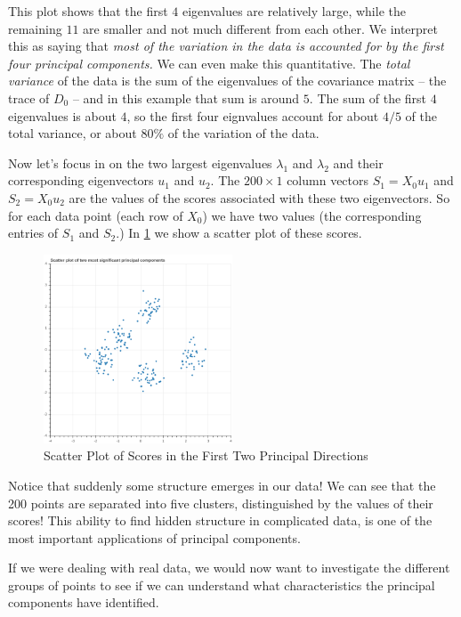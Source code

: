 \documentclass[
]{article}
\begin{document}
This plot shows that the first \(4\) eigenvalues are relatively large,
while the remaining \(11\) are smaller and not much different from each
other. We interpret this as saying that \emph{most of the variation in
the data is accounted for by the first four principal components.} We
can even make this quantitative. The \emph{total variance} of the data
is the sum of the eigenvalues of the covariance matrix -- the trace of
\(D_{0}\) -- and in this example that sum is around \(5\). The sum of
the first \(4\) eigenvalues is about \(4\), so the first four eignvalues
account for about \(4/5\) of the total variance, or about \(80\%\) of
the variation of the data.

Now let's focus in on the two largest eigenvalues \(\lambda_{1}\) and
\(\lambda_{2}\) and their corresponding eigenvectors \(u_{1}\) and
\(u_{2}\). The \(200\times 1\) column vectors \(S_{1}=X_{0}u_{1}\) and
\(S_{2}=X_{0}u_{2}\) are the values of the scores associated with these
two eigenvectors. So for each data point (each row of \(X_{0}\)) we have
two values (the corresponding entries of \(S_{1}\) and \(S_{2}\).) In
\cref{fig:principalvalues} we show a scatter plot of these scores.

\begin{figure}
\hypertarget{fig:principalvalues}{%
\centering
\includegraphics[width=0.5\textwidth,height=\textheight]{../img/pcadimred.png}
\caption{Scatter Plot of Scores in the First Two Principal
Directions}\label{fig:principalvalues}
}
\end{figure}

Notice that suddenly some structure emerges in our data! We can see that
the 200 points are separated into five clusters, distinguished by the
values of their scores! This ability to find hidden structure in
complicated data, is one of the most important applications of principal
components.

If we were dealing with real data, we would now want to investigate the
different groups of points to see if we can understand what
characteristics the principal components have identified.
\end{document}
